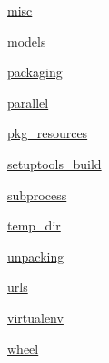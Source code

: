 \begin{DoxyCompactItemize}
\item 
 \hyperlink{namespacepip_1_1__internal_1_1utils_1_1misc}{misc}
\item 
 \hyperlink{namespacepip_1_1__internal_1_1utils_1_1models}{models}
\item 
 \hyperlink{namespacepip_1_1__internal_1_1utils_1_1packaging}{packaging}
\item 
 \hyperlink{namespacepip_1_1__internal_1_1utils_1_1parallel}{parallel}
\item 
 \hyperlink{namespacepip_1_1__internal_1_1utils_1_1pkg__resources}{pkg\+\_\+resources}
\item 
 \hyperlink{namespacepip_1_1__internal_1_1utils_1_1setuptools__build}{setuptools\+\_\+build}
\item 
 \hyperlink{namespacepip_1_1__internal_1_1utils_1_1subprocess}{subprocess}
\item 
 \hyperlink{namespacepip_1_1__internal_1_1utils_1_1temp__dir}{temp\+\_\+dir}
\item 
 \hyperlink{namespacepip_1_1__internal_1_1utils_1_1unpacking}{unpacking}
\item 
 \hyperlink{namespacepip_1_1__internal_1_1utils_1_1urls}{urls}
\item 
 \hyperlink{namespacepip_1_1__internal_1_1utils_1_1virtualenv}{virtualenv}
\item 
 \hyperlink{namespacepip_1_1__internal_1_1utils_1_1wheel}{wheel}
\end{DoxyCompactItemize}
